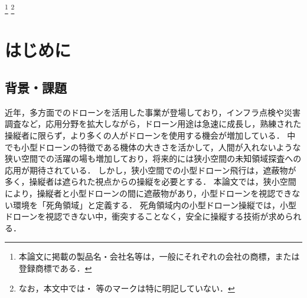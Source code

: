 \documentclass[a4paper,11pt]{ujreport}
\begin{document}

\footnote[0]{本論文に掲載の製品名・会社名等は，一般にそれぞれの会社の商標，または登録商標である．}
\footnote[0]{なお，本文中では\texttrademark ・ \textregistered 等のマークは特に明記していない．}


\setcounter{page}{0}

\tableofcontents

\clearpage


\chapter{はじめに}
\label{chap:Introduction}

\section{背景・課題}
\label{sec:Background}

近年，多方面でのドローンを活用した事業が登場しており，インフラ点検や災害調査など，応用分野を拡大しながら，ドローン用途は急速に成長し，熟練された操縦者に限らず，より多くの人がドローンを使用する機会が増加している\cite{article-drone01}\cite{article-drone02}．
中でも小型ドローンの特徴である機体の大きさを活かして，人間が入れないような狭い空間での活躍の場も増加しており\cite{article-drone04}\cite{article-drone05}，将来的には狭小空間の未知領域探査への応用が期待されている．
しかし，狭小空間での小型ドローン飛行は，遮蔽物が多く，操縦者は遮られた視点からの操縦を必要とする\cite{article-drone03}．
本論文では，狭小空間により，操縦者と小型ドローンの間に遮蔽物があり，小型ドローンを視認できない環境を「死角領域」と定義する．
死角領域内の小型ドローン操縦では，小型ドローンを視認できない中，衝突することなく，安全に操縦する技術が求められる．
\end{document}
